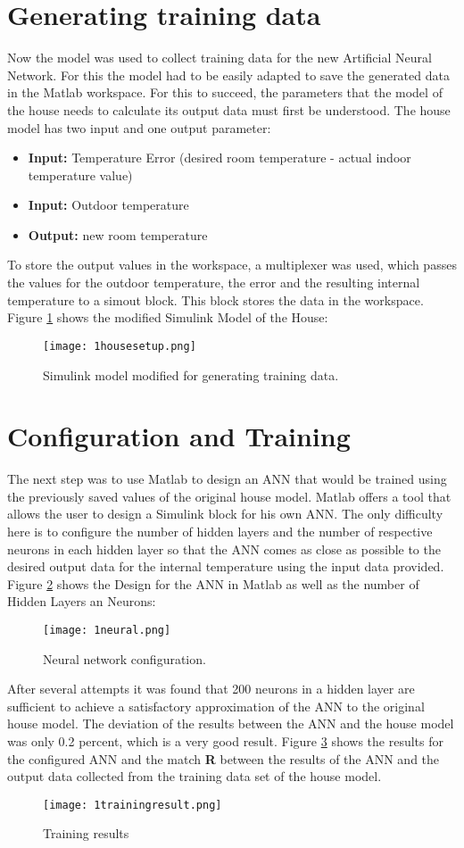 \section{Generating training data}
Now the model was used to collect training data for the new Artificial Neural Network. For this the model had to be easily adapted to save the generated data in the Matlab workspace. For this to succeed, the parameters that the model of the house needs to calculate its output data must first be understood. The house model has two input and one output parameter:
\begin{itemize}
	\item \textbf{Input:} Temperature Error (desired room temperature - actual indoor temperature value)
	\item \textbf{Input:} Outdoor temperature
	\item \textbf{Output:} new room temperature
\end{itemize}
To store the output values in the workspace, a multiplexer was used, which passes the values for the outdoor temperature, the error and the resulting internal temperature to a simout block. This block stores the data in the workspace. Figure \ref{housesetup} shows the modified Simulink Model of the House:
\begin{figure}[H]
	\centering
	\texttt{[image: 1housesetup.png]}
	\caption[Caption for LOF]{Simulink model modified for generating training data.}
	\label{housesetup}
\end{figure}
\section{Configuration and Training}
The next step was to use Matlab to design an ANN that would be trained using the previously saved values of the original house model. Matlab offers a tool that allows the user to design a Simulink block for his own ANN. The only difficulty here is to configure the number of hidden layers and the number of respective neurons in each hidden layer so that the ANN comes as close as possible to the desired output data for the internal temperature using the input data provided. Figure \ref{neural} shows the Design for the ANN in Matlab as well as the number of Hidden Layers an Neurons:
\begin{figure}[H]
	\centering
	\texttt{[image: 1neural.png]}
	\caption[Caption for LOF]{Neural network configuration.}
	\label{neural}
\end{figure}
After several attempts it was found that 200 neurons in a hidden layer are sufficient to achieve a satisfactory approximation of the ANN to the original house model. The deviation of the results between the ANN and the house model was only 0.2 percent, which is a very good result. Figure \ref{training} shows the results for the configured ANN and the match \textbf{R} between the results of the ANN and the output data collected from the training data set of the house model.
\begin{figure}[H]
	\centering
	\texttt{[image: 1trainingresult.png]}
	\caption[Caption for LOF]{Training results}
	\label{training}
\end{figure}
